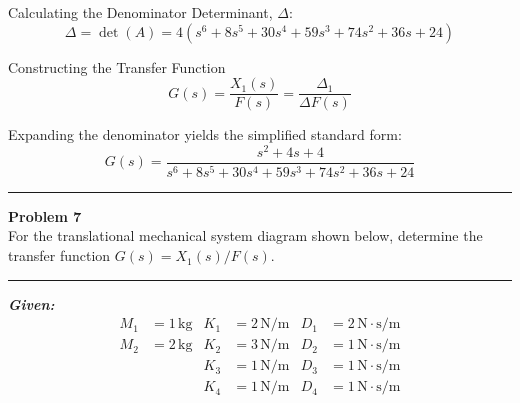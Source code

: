 ﻿\documentclass[11pt]{article}
\newcommand{\hspring}[2]{%
      \draw[spring] (#1) -- ++(2,0) node[midway, above=0.25cm]{#2};
    }
\newcommand{\hdamper}[2]{%
      \begin{scope}[shift={#1}]
        \draw (0,0) -- (0.5,0);                  %
        \draw (0.5,0) -- (0.5,0.3) -- (1.5,0.3);  %
        \draw (0.5,0) -- (0.5,-0.3) -- (1.5,-0.3);%
        
        \draw (1.0,0) -- (1.0,0.15);
        \draw (1.0,0) -- (1.0,-0.15);
        
        \draw (1.0,0) -- (2.0,0);
    
        \node[above] at (1,0.3) {#2};
      \end{scope}
    }
\newcommand{\tbody}[4]{
    \node[tbody] (#4) at (#1) {#2};
    \node at ([yshift=20mm]#4.center) {#3};
    \draw ([yshift=11mm]#4.center) -- ([yshift=18mm]#4.center);
    \draw[->] ([yshift=16mm, xshift=-4mm]#4.center) -- ([yshift=16mm, xshift=5mm]#4.center);
    }
\begin{document}
{Calculating the Denominator Determinant, $\Delta$}:
$$\Delta = \det(A) = 4(s^6 + 8s^5 + 30s^4 + 59s^3 + 74s^2 + 36s + 24)$$

{Constructing the Transfer Function}
$$G(s) = \frac{X_1(s)}{F(s)} = \frac{\Delta_1}{\Delta F(s)}$$

Expanding the denominator yields the simplified standard form:
\[
\boxed{
G(s) = \frac{s^2 + 4s + 4}{s^6 + 8s^5 + 30s^4 + 59s^3 + 74s^2 + 36s + 24}
}
\]


\newpage
  \setcounter{page}{2}  
\noindent\rule{\textwidth}{1pt}
\noindent\textbf{Problem 7} \hfill
\\For the translational mechanical system diagram shown below, determine the transfer function $G(s)=X_1(s)/F(s)$.

\begin{center}
\end{center}

\noindent\rule{\textwidth}{1pt}

\vspace{12pt}

\noindent \textbf{\textit{Given:}}
\[
\begin{aligned}
M_1 &= 1\, \text{kg} & K_1 &= 2\, \text{N/m} & D_1 &= 2\, \text{N}\cdot\text{s/m} \\
M_2 &= 2\, \text{kg} & K_2 &= 3\, \text{N/m} & D_2 &= 1\, \text{N}\cdot\text{s/m} \\
& & K_3 &= 1\, \text{N/m} & D_3 &= 1\, \text{N}\cdot\text{s/m} \\
& & K_4 &= 1\, \text{N/m} & D_4 &= 1\, \text{N}\cdot\text{s/m}
\end{aligned}
\]
\end{document}

